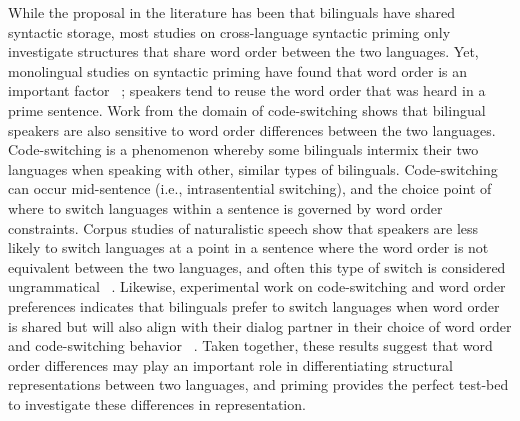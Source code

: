 While the proposal in the literature has been that bilinguals have shared syntactic storage, most studies on cross-language syntactic priming only investigate structures that share word order between the two languages. Yet, monolingual studies on syntactic priming have found that word order is an important factor ~\citep{Hartsuiker1999, Hartsuiker2000, Pickering2002}; speakers tend to reuse the word order that was heard in a prime sentence. Work from the domain of code-switching shows that bilingual speakers are also sensitive to word order differences between the two languages. Code-switching is a phenomenon whereby some bilinguals intermix their two languages when speaking with other, similar types of bilinguals. Code-switching can occur mid-sentence (i.e., intrasentential switching), and the choice point of where to switch languages within a sentence is governed by word order constraints. Corpus studies of naturalistic speech show that speakers are less likely to switch languages at a point in a sentence where the word order is not equivalent between the two languages, and often this type of switch is considered ungrammatical ~\citep{Poplack1980, Lipski1978}. Likewise, experimental work on code-switching and word order preferences indicates that bilinguals prefer to switch languages when word order is shared but will also align with their dialog partner in their choice of word order and code-switching behavior ~\citep{Kootstra2010}. Taken together, these results suggest that word order differences may play an important role in differentiating structural representations between two languages, and priming provides the perfect test-bed to investigate these differences in representation.

